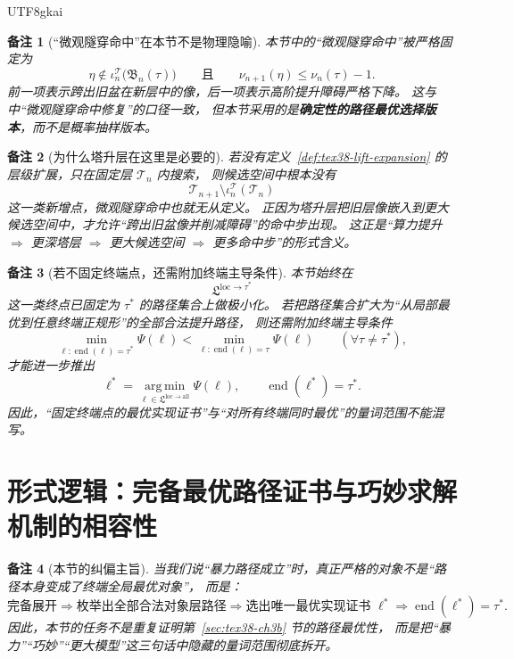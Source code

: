 \documentclass[12pt]{article}
\newtheorem{remark}{备注}[section]
\begin{document}
\begin{CJK*}{UTF8}{gkai}
\begin{remark}[“微观隧穿命中”在本节不是物理隐喻]
本节中的“微观隧穿命中”被严格固定为
\[
  \eta\notin \iota_n^{\mathcal T}\bigl(\mathfrak B_n(\tau)\bigr)
  \qquad\text{且}\qquad
  \nu_{n+1}(\eta)\le \nu_n(\tau)-1.
\]
前一项表示跨出旧盆在新层中的像，后一项表示高阶提升障碍严格下降。
这与 \cite{RepoTex36HomotopyTwistBijection} 中“微观隧穿命中修复”的口径一致，
但本节采用的是\textbf{确定性的路径最优选择版本}，而不是概率抽样版本。
\end{remark}

\begin{remark}[为什么塔升层在这里是必要的]
若没有定义~\ref{def:tex38-lift-expansion} 的层级扩展，只在固定层 $\mathcal T_n$ 内搜索，
则候选空间中根本没有
\[
  \mathcal T_{n+1}\setminus \iota_n^{\mathcal T}(\mathcal T_n)
\]
这一类新增点，微观隧穿命中也就无从定义。
正因为塔升层把旧层像嵌入到更大候选空间中，才允许“跨出旧盆像并削减障碍”的命中步出现。
这正是“算力提升 $\Rightarrow$ 更深塔层 $\Rightarrow$ 更大候选空间 $\Rightarrow$ 更多命中步”的形式含义。
\end{remark}

\begin{remark}[若不固定终端点，还需附加终端主导条件]
本节始终在
\[
  \mathfrak L^{\mathrm{loc}\to\tau^\ast}
\]
这一类\emph{终点已固定为 $\tau^\ast$} 的路径集合上做极小化。
若把路径集合扩大为“从局部最优到任意终端正规形”的全部合法提升路径，
则还需附加终端主导条件
\[
  \min_{\ell:\operatorname{end}(\ell)=\tau^\ast}\Psi(\ell)
  <
  \min_{\ell:\operatorname{end}(\ell)=\tau}\Psi(\ell)
  \qquad
  (\forall \tau\neq\tau^\ast),
\]
才能进一步推出
\[
  \ell^\ast
  =
  \operatorname*{arg\,min}_{\ell\in\mathfrak L^{\mathrm{loc}\to\mathrm{all}}}
  \Psi(\ell),
  \qquad
  \operatorname{end}(\ell^\ast)=\tau^\ast.
\]
因此，“固定终端点的最优实现证书”与“对所有终端同时最优”的量词范围不能混写。
\end{remark}

\clearpage

\section{形式逻辑：完备最优路径证书与巧妙求解机制的相容性}
\label{sec:tex38-ch3c}

\begin{remark}[本节的纠偏主旨]
当我们说“暴力路径成立”时，真正严格的对象不是“路径本身变成了终端全局最优对象”，
而是：
\[
  \text{完备展开}
  \Longrightarrow
  \text{枚举出全部合法对象层路径}
  \Longrightarrow
  \text{选出唯一最优实现证书 }\ell^\ast
  \Longrightarrow
  \operatorname{end}(\ell^\ast)=\tau^\ast.
\]
因此，本节的任务不是重复证明第~\ref{sec:tex38-ch3b} 节的路径最优性，
而是把“暴力”“巧妙”“更大模型”这三句话中隐藏的量词范围彻底拆开。
\end{remark}


\end{CJK*}
\end{document}
